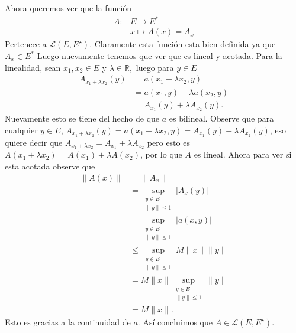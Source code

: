 \begin{itemize}
\begin{sproof}
      Ahora queremos ver que la función
      \begin{align*}
        A:&E\to E^*\\
        &x\mapsto A(x)=A_x
      \end{align*}
      Pertenece a $\mathcal{L}\left(E, E^{\star}\right).$ Claramente esta función esta bien definida ya que $A_x\in E^*$ Luego nuevamente tenemos que ver que es lineal y acotada. Para la linealidad, sean $x_1,x_2\in E$ y $\lambda\in \mathbb{R},$ luego para $y\in E$
      \begin{align*}
        A_{x_1+\lambda x_2}(y)&=a(x_1+\lambda x_2,y)\\
        &=a(x_1,y)+\lambda a(x_2,y)\\
        &=A_{x_1}(y)+\lambda A_{x_2}(y).
      \end{align*}
      Nuevamente esto se tiene del hecho de que $a$ es bilineal. Observe que para cualquier $y\in E$, $A_{x_1+\lambda x_2}(y)=a(x_1+\lambda x_2,y)=A_{x_1}(y)+\lambda A_{x_2}(y)$, eso quiere decir que $A_{x_1+\lambda x_2}=A_{x_1}+\lambda A_{x_2}$ pero esto es $A(x_1+\lambda x_2)=A(x_1)+\lambda A(x_2)$, por lo que $A$ es lineal. Ahora para ver si esta acotada observe que
      \begin{align*}
        \|A(x)\|&=\|A_x\|\\
        &=\sup_{\substack{y\in E\\\|y\|\leq 1}}|A_x(y)|\\
        &=\sup_{\substack{y\in E\\\|y\|\leq 1}}|a(x,y)|\\
        &\leq \sup_{\substack{y\in E\\\|y\|\leq 1}}M\|x\|\|y\|\\
        &=M\|x\|\sup_{\substack{y\in E\\\|y\|\leq 1}}\|y\|\\
        &=M\|x\|.
      \end{align*}
      Esto es gracias a la continuidad de $a.$ Así concluimos que $A\in\mathcal{L}\left(E, E^{\star}\right).$ 


\end{sproof}
\end{itemize}
